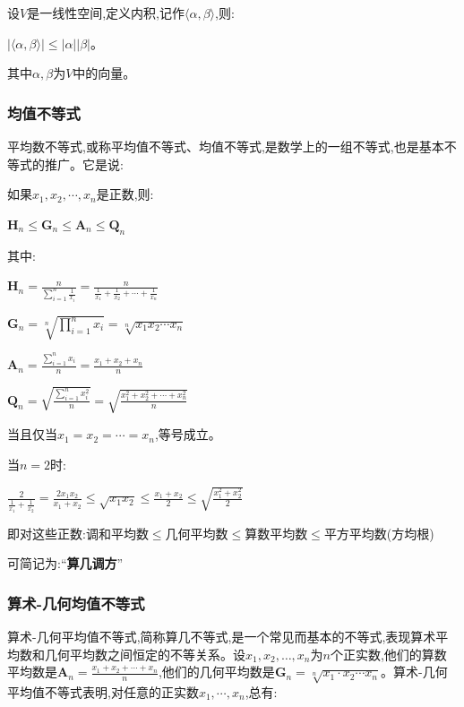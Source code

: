 \documentclass[UTF8]{ctexbook}
\newcommand{\upDownSum}[2]{\sum\limits_{#2}^{#1}}
\newcommand{\upDownProd}[2]{\prod\limits_{#2}^{#1}}
\newcommand{\innerProduct}[2]{\langle#1,#2\rangle}
\begin{document}
{{{{\begin{itemize}
{          设$V$是一线性空间,定义内积,记作$\innerProduct{\alpha}{\beta}$,则:

          $|\innerProduct{\alpha}{\beta}| \leq |\alpha||\beta|$。

          其中$\alpha,\beta$为$V$中的向量。
          }
  \end{itemize}
}%

\subsubsection{均值不等式}{
平均数不等式,或称平均值不等式、均值不等式,是数学上的一组不等式,也是基本不等式的推广。它是说:

如果$x_{1},x_{2},\dotsm,x_{n}$是正数,则:

$\mathbf{H}_n \leq \mathbf{G}_n \leq \mathbf{A}_n \leq \mathbf{Q}_n$

其中:

$\mathbf{H}_n = \frac{n}{\upDownSum{n}{i = 1}\frac{1}{x_i}} = \frac{n}{\frac{1}{x_1} + \frac{1}{x_2} + \dotsm + \frac{1}{x_n}}$

$\mathbf{G}_n = \sqrt[n]{\upDownProd{n}{i = 1}x_i} = \sqrt[n]{x_1x_2\dotsm x_n}$

$\mathbf{A}_n = \frac{\upDownSum{n}{i = 1}x_i}{n} = \frac{x_1 + x_2 + x_n}{n}$

$\mathbf{Q}_n = \sqrt{\frac{\upDownSum{n}{i = 1}x^2_i}{n}} = \sqrt{\frac{x^2_1 + x^2_2 + \dotsm + x^2_n}{n}}$

当且仅当$x_1 = x_2 = \dotsm = x_n$,等号成立。

当$n = 2$时:

$\frac{2}{\frac{1}{x_1} + \frac{1}{x_2}} = \frac{2x_1x_2}{x_1 + x_2}\leq\sqrt{x_1x_2}\leq\frac{x_1 + x_2}{2}\leq\sqrt{\frac{x_1^2 + x_2^2}{2}}$

即对这些正数:调和平均数$\leq$几何平均数$\leq$算数平均数$\leq$平方平均数(方均根)

可简记为:“{\bfseries 算几调方}”
}%

\subsubsection{算术-几何均值不等式}{
  算术-几何平均值不等式,简称算几不等式,是一个常见而基本的不等式,表现算术平均数和几何平均数之间恒定的不等关系。设$x_1,x_2,\dots,x_n$为$n$个正实数,他们的算数平均数是$\mathbf{A}_n = \frac{x_1 + x_2 + \dotsm + x_n}{n}$,他们的几何平均数是$\mathbf{G}_n = \sqrt[n]{x_1\cdot x_2 \dotsm x_n}$。算术-几何平均值不等式表明,对任意的正实数$x_1,\dotsm,x_n$,总有:

}}}}
\end{document}
